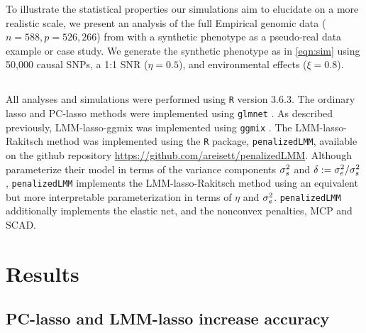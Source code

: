 To illustrate the statistical properties our simulations aim to elucidate on a more realistic scale, we present an analysis of the full Empirical genomic data ($n=588, p=526,266$) from \citet{larkin2015objectives} with a synthetic phenotype as a pseudo-real data example or case study. We generate the synthetic phenotype as in \eqref{eqn:sim} using 50,000 causal SNPs, a 1:1 SNR ($\eta = 0.5$), and environmental effects ($\xi = 0.8$).

\subsection{}
\label{sec:software}

All analyses and simulations were performed using \texttt{R} version 3.6.3. The ordinary lasso and PC-lasso methods were implemented using \texttt{glmnet} \citep{glmnet}. As described previously, LMM-lasso-ggmix was implemented using \texttt{ggmix} \citep{bhatnagar2020simultaneous}. The LMM-lasso-Rakitsch method was implemented using the \texttt{R} package, \texttt{penalizedLMM}, available on the github repository \url{https://github.com/areisett/penalizedLMM}. Although \citet{rakitsch2013lasso} parameterize their model in terms of the variance components $\sigma^2_s$ and $\delta := \sigma^2_e / \sigma^2_s$, \texttt{penalizedLMM} implements the LMM-lasso-Rakitsch method using an equivalent but more interpretable parameterization in terms of $\eta$ and $\sigma^2_e$. \texttt{penalizedLMM} additionally implements the elastic net, and the nonconvex penalties, MCP and SCAD.  


\section{Results} \label{sec:results}

\subsection{PC-lasso and LMM-lasso increase accuracy}
\label{sec:sim-mse}

